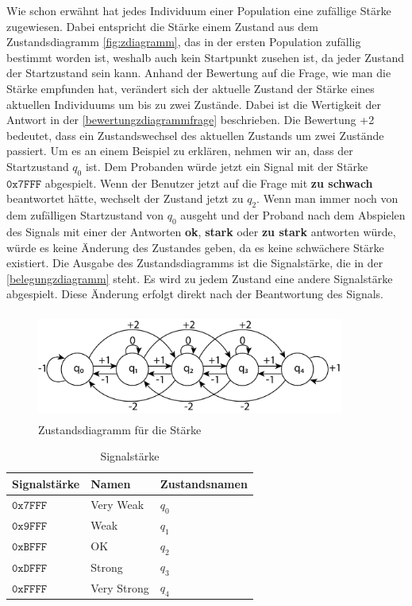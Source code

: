 Wie schon erw{\"a}hnt hat jedes Individuum einer Population eine zuf{\"a}llige St{\"a}rke zugewiesen.
Dabei entspricht die St{\"a}rke einem Zustand aus dem Zustandsdiagramm \autoref{fig:zdiagramm}, das in der ersten Population zuf{\"a}llig bestimmt worden ist, weshalb auch kein Startpunkt zusehen ist, da jeder Zustand der Startzustand sein kann. Anhand der Bewertung auf die Frage, wie man die St{\"a}rke empfunden hat, ver{\"a}ndert sich der aktuelle Zustand der St{\"a}rke eines aktuellen Individuums um bis zu zwei Zust{\"a}nde. Dabei ist die Wertigkeit der Antwort in der \autoref{bewertungzdiagrammfrage} beschrieben. 
Die Bewertung +2 bedeutet, dass ein Zustandswechsel des aktuellen Zustands um zwei Zust{\"a}nde passiert. 
Um es an einem Beispiel zu erkl{\"a}ren, nehmen wir an, dass der Startzustand $q_{0}$ ist. Dem Probanden w{\"u}rde jetzt ein Signal mit der St{\"a}rke $\mathtt{0x7FFF}$ abgespielt. Wenn der Benutzer jetzt auf die Frage mit \textbf{zu schwach} beantwortet h{\"a}tte, wechselt der Zustand jetzt zu $q_{2}$. Wenn man immer noch von dem zuf{\"a}lligen Startzustand von $q_{0}$ ausgeht und der Proband nach dem Abspielen des Signals mit einer der Antworten \textbf{ok}, \textbf{stark} oder \textbf{zu stark} antworten w{\"u}rde, w{\"u}rde es keine {\"A}nderung des Zustandes geben, da es keine schw{\"a}chere St{\"a}rke existiert. Die Ausgabe des Zustandsdiagramms ist die Signalst{\"a}rke, die in der \autoref{belegungzdiagramm} steht. Es wird zu jedem Zustand eine andere Signalst{\"a}rke abgespielt. Diese {\"A}nderung erfolgt direkt nach der Beantwortung des Signals. 

\begin{figure}
	\centering
    \includegraphics[width=0.9\textwidth,height=3.5cm]{pics/entwurf/zdiagramm3.png}
    \caption{Zustandsdiagramm f{\"u}r die St{\"a}rke}
    \label{fig:zdiagramm}
\end{figure}

\begin{table}[]
\centering
\caption{Signalst{\"a}rke}
\label{belegungzdiagramm}
\begin{tabular}{l|l|l}
  Signalst{\"a}rke  & Namen       & Zustandsnamen \\ \hline
  $\mathtt{0x7FFF}$ & Very Weak   & $q_{0}$       \\ \hline
  $\mathtt{0x9FFF}$ & Weak        & $q_{1}$       \\ \hline
  $\mathtt{0xBFFF}$ & OK          & $q_{2}$       \\ \hline
  $\mathtt{0xDFFF}$ & Strong      & $q_{3}$       \\ \hline
  $\mathtt{0xFFFF}$ & Very Strong & $q_{4}$       \\
\end{tabular}
\end{table}

